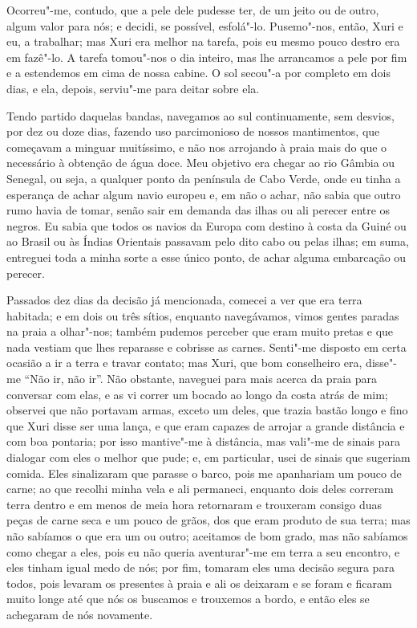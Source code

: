 Ocorreu"-me, contudo, que a pele dele pudesse ter, de um jeito ou de
outro, algum valor para nós; e decidi, se possível, esfolá"-lo.
Pusemo"-nos, então, Xuri e eu, a trabalhar; mas Xuri era melhor na
tarefa, pois eu mesmo pouco destro era em fazê"-lo. A tarefa tomou"-nos o
dia inteiro, mas lhe arrancamos a pele por fim e a estendemos em cima de
nossa cabine. O sol secou"-a por completo em dois dias, e ela, depois,
serviu"-me para deitar sobre ela.

Tendo partido daquelas bandas, navegamos ao sul continuamente, sem
desvios, por dez ou doze dias, fazendo uso parcimonioso de nossos
mantimentos, que começavam a minguar muitíssimo, e não nos arrojando à
praia mais do que o necessário à obtenção de água doce. Meu objetivo era
chegar ao rio Gâmbia ou Senegal, ou seja, a qualquer ponto da península
de Cabo Verde, onde eu tinha a esperança de achar algum navio europeu e,
em não o achar, não sabia que outro rumo havia de tomar, senão sair em
demanda das ilhas ou ali perecer entre os negros. Eu sabia que todos os
navios da Europa com destino à costa da Guiné ou ao Brasil ou às Índias
Orientais passavam pelo dito cabo ou pelas ilhas; em suma, entreguei
toda a minha sorte a esse único ponto, de achar alguma embarcação ou
perecer.

Passados dez dias da decisão já mencionada, comecei a ver que era terra
habitada; e em dois ou três sítios, enquanto navegávamos, vimos gentes
paradas na praia a olhar"-nos; também pudemos perceber que eram muito
pretas e que nada vestiam que lhes reparasse e cobrisse as carnes.
Senti"-me disposto em certa ocasião a ir a terra e travar contato; mas
Xuri, que bom conselheiro era, disse"-me ``Não ir, não ir''. Não
obstante, naveguei para mais acerca da praia para conversar com elas, e
as vi correr um bocado ao longo da costa atrás de mim; observei que não
portavam armas, exceto um deles, que trazia bastão longo e fino que Xuri
disse ser uma lança, e que eram capazes de arrojar a grande distância e
com boa pontaria; por isso mantive"-me à distância, mas vali"-me de sinais
para dialogar com eles o melhor que pude; e, em particular, usei de
sinais que sugeriam comida. Eles sinalizaram que parasse o barco, pois
me apanhariam um pouco de carne; ao que recolhi minha vela e ali
permaneci, enquanto dois deles correram terra dentro e em menos de meia
hora retornaram e trouxeram consigo duas peças de carne seca e um pouco
de grãos, dos que eram produto de sua terra; mas não sabíamos o que era
um ou outro; aceitamos de bom grado, mas não sabíamos como chegar a
eles, pois eu não queria aventurar"-me em terra a seu encontro, e eles
tinham igual medo de nós; por fim, tomaram eles uma decisão segura para
todos, pois levaram os presentes à praia e ali os deixaram e se foram e
ficaram muito longe até que nós os buscamos e trouxemos a bordo, e então
eles se achegaram de nós novamente.

